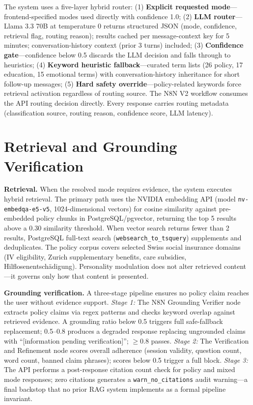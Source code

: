 \documentclass[10pt,a4paper]{report}
\begin{document}
The system uses a five-layer hybrid router: (1) \textbf{Explicit requested mode}---frontend-specified modes used directly with confidence 1.0; (2) \textbf{LLM router}---Llama 3.3 70B at temperature 0 returns structured JSON (mode, confidence, retrieval flag, routing reason); results cached per message-context key for 5 minutes; conversation-history context (prior 3 turns) included; (3) \textbf{Confidence gate}---confidence below 0.5 discards the LLM decision and falls through to heuristics; (4) \textbf{Keyword heuristic fallback}---curated term lists (26 policy, 17 education, 15 emotional terms) with conversation-history inheritance for short follow-up messages; (5) \textbf{Hard safety override}---policy-related keywords force retrieval activation regardless of routing source. The N8N V2 workflow consumes the API routing decision directly. Every response carries routing metadata (classification source, routing reason, confidence score, LLM latency).

\section{Retrieval and Grounding Verification}

\textbf{Retrieval.} When the resolved mode requires evidence, the system executes hybrid retrieval. The primary path uses the NVIDIA embedding API (model \texttt{nv-embedqa-e5-v5}, 1024-dimensional vectors) for cosine similarity against pre-embedded policy chunks in PostgreSQL/pgvector, returning the top 5 results above a 0.30 similarity threshold. When vector search returns fewer than 2 results, PostgreSQL full-text search (\texttt{websearch\_to\_tsquery}) supplements and deduplicates. The policy corpus covers selected Swiss social insurance domains (IV eligibility, Zurich supplementary benefits, care subsidies, Hilflosenentschädigung). Personality modulation does not alter retrieved content---it governs only how that content is presented.

\textbf{Grounding verification.} A three-stage pipeline ensures no policy claim reaches the user without evidence support. \emph{Stage 1:} The N8N Grounding Verifier node extracts policy claims via regex patterns and checks keyword overlap against retrieved evidence. A grounding ratio below 0.5 triggers full safe-fallback replacement; 0.5--0.8 produces a degraded response replacing ungrounded claims with ``[information pending verification]''; $\geq 0.8$ passes. \emph{Stage 2:} The Verification and Refinement node scores overall adherence (session validity, question count, word count, banned claim phrases); scores below 0.5 trigger a full block. \emph{Stage 3:} The API performs a post-response citation count check for policy and mixed mode responses; zero citations generates a \texttt{warn\_no\_citations} audit warning---a final backstop that no prior RAG system implements as a formal pipeline invariant.
\end{document}
